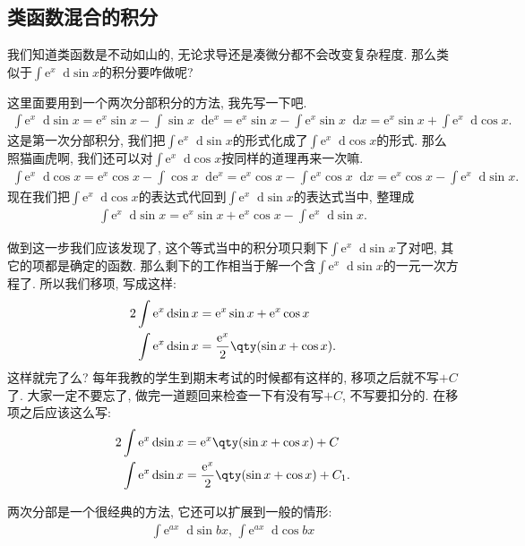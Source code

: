 \documentclass{ctexbook}
\newcommand{\e}{\mathrm{e}}
\newcommand*{\dif}{\mathop{}\!\mathrm{d}}
\begin{document}
{\subsection{\uppercase\expandafter{}类函数混合的积分}
我们知道\uppercase\expandafter{}类函数是不动如山的, 无论求导还是凑微分都不会改变复杂程度. 那么类似于$\int\e^{x}\dif{\sin{x}}$的积分要咋做呢? \par
这里面要用到一个两次分部积分的方法, 我先写一下吧. 
\begin{align*}
\int\e^{x}\dif{\sin{x}}=\e^{x}\sin{x}-\int\sin{x}\dif{\e^{x}}=\e^{x}\sin{x}-\int\e^{x}\sin{x}\dif{x}=\e^{x}\sin{x}+\int\e^{x}\dif{\cos{x}}
.\end{align*}
这是第一次分部积分, 我们把$\int\e^{x}\dif{\sin{x}}$的形式化成了$\int\e^{x}\dif{\cos{x}}$的形式. 那么照猫画虎啊, 我们还可以对$\int\e^{x}\dif{\cos{x}}$按同样的道理再来一次嘛. 
\begin{align*}
\int\e^{x}\dif{\cos{x}}=\e^{x}\cos{x}-\int\cos{x}\dif{\e^{x}}=\e^{x}\cos{x}-\int\e^{x}\cos{x}\dif{x}=\e^{x}\cos{x}-\int\e^{x}\dif{\sin{x}}
.\end{align*}
现在我们把$\int\e^{x}\dif{\cos{x}}$的表达式代回到$\int\e^{x}\dif{\sin{x}}$的表达式当中, 整理成
\begin{align*}
\int\e^{x}\dif{\sin{x}}=\e^{x}\sin{x}+\e^{x}\cos{x}-\int\e^{x}\dif{\sin{x}}
.\end{align*}\par
做到这一步我们应该发现了, 这个等式当中的积分项只剩下$\int\e^{x}\dif{\sin{x}}$了对吧, 其它的项都是确定的函数. 那么剩下的工作相当于解一个含$\int\e^{x}\dif{\sin{x}}$的一元一次方程了. 所以我们移项, 写成这样: 
\begin{align*}
2\int\e^{x}\dif{\sin{x}}={}&\e^{x}\sin{x}+\e^{x}\cos{x}\\
\int\e^{x}\dif{\sin{x}}={}&\frac{\e^{x}}{2}\qty(\sin{x}+\cos{x})
.\end{align*}
这样就完了么? 每年我教的学生到期末考试的时候都有这样的, 移项之后就不写$+C$了. 大家一定不要忘了, 做完一道题回来检查一下有没有写$+C$, 不写要扣分的. 在移项之后应该这么写: 
\begin{align*}
2\int\e^{x}\dif{\sin{x}}={}&\e^{x}\qty(\sin{x}+\cos{x})+C\\
\int\e^{x}\dif{\sin{x}}={}&\frac{\e^{x}}{2}\qty(\sin{x}+\cos{x})+C_{1}
.\end{align*}\par
两次分部是一个很经典的方法, 它还可以扩展到一般的情形: 
\begin{align*}
\int\e^{ax}\dif{\sin{bx}},\,\int\e^{ax}\dif{\cos{bx}}

\end{align*}}
\end{document}
